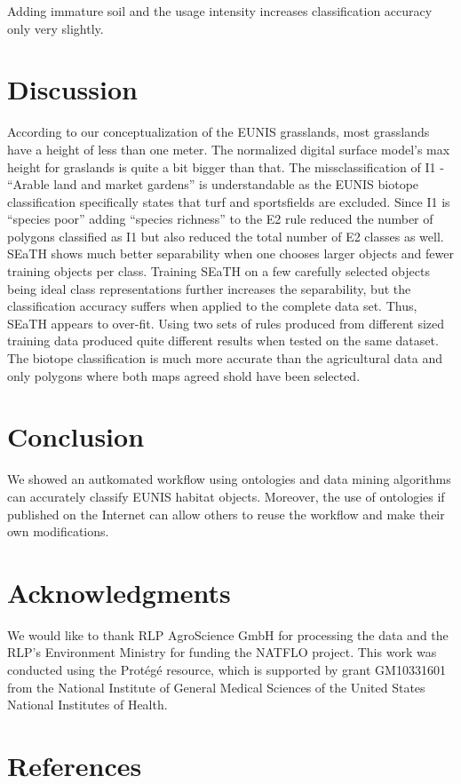 \documentclass[authoryear, review,12pt,number]{elsarticle}
\begin{document}
Adding immature soil and the usage intensity increases classification accuracy 
only very slightly.


\section{Discussion}
According to our conceptualization of the EUNIS grasslands, most grasslands 
have a height of less than one meter. The normalized digital surface model's 
max height for graslands is quite a bit bigger than that.
The missclassification of I1 - ``Arable land and market gardens'' is 
understandable as the EUNIS biotope classification specifically states that 
turf and sportsfields are excluded. Since I1 is ``species poor'' adding 
``species richness'' to the E2 rule reduced the number of polygons classified 
as I1 but also reduced the total number of E2 classes as well.\\
SEaTH shows much better separability when one chooses
larger objects and fewer training objects per class. Training SEaTH on a few
carefully selected objects being ideal class representations further increases
the separability, but the classification accuracy suffers when applied to the
complete data set. Thus, SEaTH appears to over-fit. Using two sets of rules
produced from different sized training data produced quite different results
when tested on the same dataset.
The biotope classification is much more accurate than the agricultural data and 
only polygons where both maps agreed shold have been selected.
\section{Conclusion} We showed an autkomated
workflow using ontologies and data mining algorithms can accurately classify
EUNIS habitat objects. Moreover, the use of ontologies if published on the
Internet can allow others to reuse the workflow and make their own
modifications. 
\section{Acknowledgments}
We would like to thank RLP AgroScience GmbH for processing the data and the
RLP's Environment Ministry for funding the NATFLO project. This work was
conducted using the Prot\'eg\'e resource, which is supported by grant GM10331601
from the National Institute of General Medical Sciences of the United States
National
Institutes of Health.

\section{References}  
\end{document}
